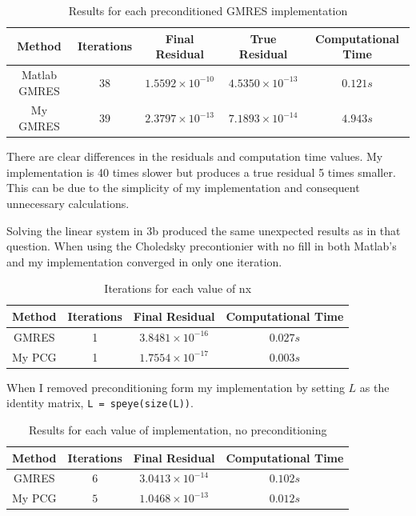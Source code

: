 \documentclass[a4paper, 11pt]{article}
\begin{document}
			\begin{table}[H]
				\centering
				\begin{tabular}{c|c|c|c|c}
					\textbf{Method} &  \textbf{Iterations} 	& \textbf{Final Residual} 	 & \textbf{True Residual}		& \textbf{Computational Time} 	\\ \hline
					Matlab GMRES	& 			$38$ 		& $ 1.5592 \times 10^{-10} $ & $ 4.5350 \times 10^{-13} $	& $ 0.121 s $	\\ \hline
					My GMRES		& 			$39$ 		& $ 2.3797 \times 10^{-13} $ & $ 7.1893 \times 10^{-14} $	& $ 4.943 s $	\\ 
				\end{tabular}
				\caption{Results for each preconditioned GMRES implementation}
				\label{table:ex6}
			\end{table}
			
			There are clear differences in the residuals and computation time values.
			My implementation is 40 times slower but produces a true residual 5 times smaller.
			This can be due to the simplicity of my implementation and consequent unnecessary calculations.		
		
		
			Solving the linear system in 3b produced the same unexpected results as in that question.
			When using the Choledsky precontionier with no fill in both Matlab's and my implementation converged in only one iteration.
			
			\begin{table}[H]
				\centering
				\begin{tabular}{c|c|c|c}
					\textbf{Method} &  \textbf{Iterations} 	& \textbf{Final Residual} 		& \textbf{Computational Time} 	\\ \hline
					GMRES 			& 			1 			& $ 3.8481 \times 10^{-16} $	& $ 0.027 s $	\\ \hline	
					My PCG 			& 			1			& $ 1.7554 \times 10^{-17} $	& $ 0.003 s $	\\ \hline
				\end{tabular}
				\caption{Iterations for each value of nx}
				\label{table:ex6_c_prec}
			\end{table}	
		
			When I removed preconditioning form my implementation by setting $L$ as the identity matrix, \texttt{L = speye(size(L))}.
				
			\begin{table}[H]
				\centering
				\begin{tabular}{c|c|c|c}
					\textbf{Method} &  \textbf{Iterations} 	& \textbf{Final Residual} 		& \textbf{Computational Time} 	\\ \hline
					GMRES			& 			$6$ 		& $ 3.0413 \times 10^{-14} $ 	& $ 0.102 s $	\\ \hline	
					My PCG 			& 			$5$			& $ 1.0468 \times 10^{-13} $	& $ 0.012 s $	\\ \hline
				\end{tabular}
				\caption{Results for each value of implementation, no preconditioning}
				\label{table:ex6_c_NoPrec}
			\end{table}
		
\end{document}
